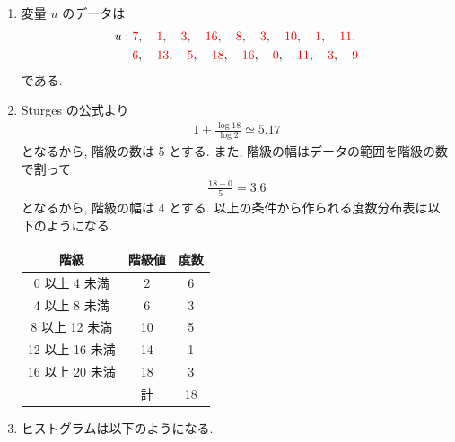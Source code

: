\stepup
\begin{qenumerate}
	\item{
		\begin{enumerate}
			\item{
				変量 $u$ のデータは
				\begin{align}
					u: \textcolor{red}{7}&, \quad \textcolor{red}{1}, \quad \textcolor{red}{3}, \quad \textcolor{red}{16}, \quad \textcolor{red}{8}, \quad \textcolor{red}{3}, \quad \textcolor{red}{10}, \quad \textcolor{red}{1}, \quad \textcolor{red}{11}, \\
						 \textcolor{red}{6}&, \quad \textcolor{red}{13}, \quad \textcolor{red}{5}, \quad \textcolor{red}{18}, \quad \textcolor{red}{16}, \quad \textcolor{red}{0}, \quad \textcolor{red}{11}, \quad \textcolor{red}{3}, \quad \textcolor{red}{9}
				\end{align}
				である.
			}
			\item{
				Sturges の公式より
				\begin{align}
					1 + \frac{\log{18}}{\log{2}} \simeq 5.17
				\end{align}
				となるから, 階級の数は 5 とする.
				また, 階級の幅はデータの範囲を階級の数で割って
				\begin{align}
					\frac{18 - 0}{5} = 3.6
				\end{align}
				となるから, 階級の幅は 4 とする.
				以上の条件から作られる度数分布表は以下のようになる.
				\begin{table}[H]
					\centering
					\begin{tabular}{c|c|c} \hline
						階級 & 階級値 & 度数 \\ \hline
						0 以上 4 未満   & 2 & 6 \\
						4 以上 8 未満   &  6 & 3 \\
						8 以上 12 未満  & 10 & 5 \\
						12 以上 16 未満 & 14 & 1 \\
						16 以上 20 未満 & 18 & 3 \\ \hline
						               & 計 & 18 \\ \hline
					\end{tabular}
				\end{table}
			}
			\item{
				ヒストグラムは以下のようになる.
				\begin{figure}[H]
					\centering

\end{figure}}
\end{enumerate}}
\end{qenumerate}
